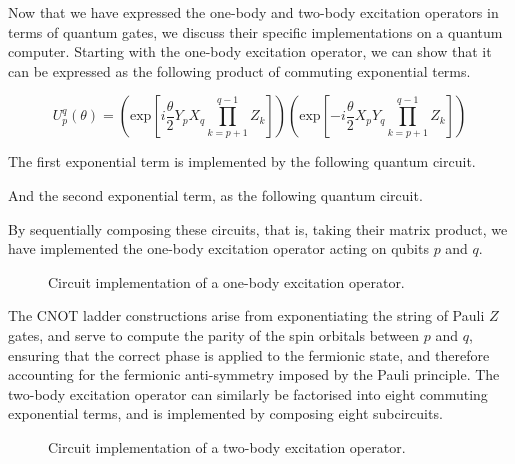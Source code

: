 Now that we have expressed the one-body and two-body excitation operators in terms of quantum gates, we discuss their specific implementations on a quantum computer. Starting with the one-body excitation operator, we can show that it can be expressed as the following product of commuting exponential terms.

\begin{equation*}
    U^q_p (\theta) =
    \left( \text{exp} \left[
    i \frac{\theta}{2} Y_p X_q \prod_{k=p+1}^{q-1} Z_k \right] \right)
    \left( \text{exp} \left[ -
    i \frac{\theta}{2} X_p Y_q \prod_{k=p+1}^{q-1} Z_k \right] \right)
\end{equation*}

The first exponential term is implemented by the following quantum circuit.


And the second exponential term, as the following quantum circuit.


By sequentially composing these circuits, that is, taking their matrix product, we have implemented the one-body excitation operator acting on qubits $p$ and $q$.

\begin{figure}[H]
    \centering
    \caption{Circuit implementation of a one-body excitation operator.}
    \label{one-body-implementation}
\end{figure}

The CNOT ladder constructions arise from exponentiating the string of Pauli $Z$ gates, and serve to compute the parity of the spin orbitals between $p$ and $q$, ensuring that the correct phase is applied to the fermionic state, and therefore accounting for the fermionic anti-symmetry imposed by the Pauli principle. The two-body excitation operator can similarly be factorised into eight commuting exponential terms, and is implemented by composing eight subcircuits.

\begin{figure}[H]
    \centering
    \caption{Circuit implementation of a two-body excitation operator.}
    \label{two-body-implementation}
\end{figure}

